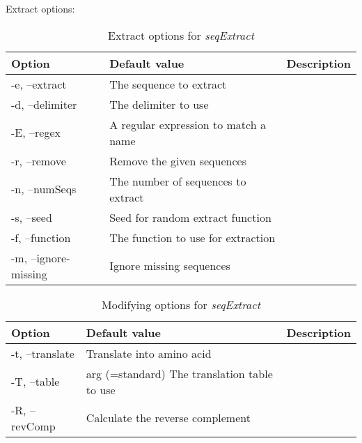 Extract options:
\begin{table}[H]
\caption{Extract options for \textit{seqExtract}}
\begin{tabular}{llp{12cm}}
\hline
Option & Default value & Description\\
\hline
  -e, --extract        & The sequence to extract\\
  -d, --delimiter      & The delimiter to use\\
  -E, --regex          & A regular expression to match a name\\
  -r, --remove         & Remove the given sequences\\
  -n, --numSeqs        & The number of sequences to extract\\
  -s, --seed           & Seed for random extract function\\
  -f, --function       & The function to use for extraction\\
  -m, --ignore-missing & Ignore missing sequences\\
  \hline
\end{tabular}
\end{table}



\begin{table}[H]
\caption{Modifying options for \textit{seqExtract}}
\begin{tabular}{llp{12cm}}
\hline
Option & Default value & Description\\
\hline
  -t, --translate &                 Translate into amino acid\\
  -T, --table & arg (=standard)     The translation table to use\\
  -R, --revComp &                   Calculate the reverse complement\\
  \hline
\end{tabular}
\end{table}